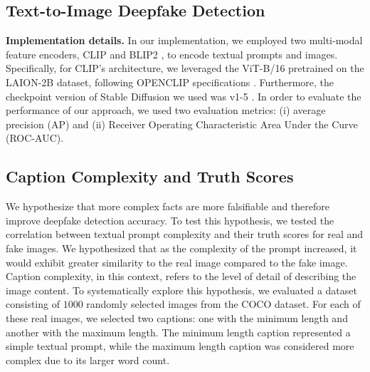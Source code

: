 \documentclass{article} \usepackage{iclr2024_conference,times}
\begin{document}
\subsection{Text-to-Image Deepfake Detection}
\label{app:tti}
\textbf{Implementation details.}
In our implementation, we employed two multi-modal feature encoders, CLIP \citep{clip} and BLIP2 \citep{blip2}, to encode textual prompts and images. Specifically, for CLIP's architecture, we leveraged the ViT-B/16 pretrained on the LAION-2B dataset, following OPENCLIP specifications \citep{Ilharco_OpenCLIP_2021}. Furthermore, the checkpoint version of Stable Diffusion we used was v1-5 \citep{sd_version}.
In order to evaluate the performance of our approach, we used two evaluation metrics: (i) average precision (AP) and (ii) Receiver Operating Characteristic Area Under the Curve (ROC-AUC). 


\subsection{Caption Complexity and Truth Scores}
\label{app:cap_complexity}
We hypothesize that more complex facts are more falsifiable and therefore improve deepfake detection accuracy. To test this hypothesis, we tested the correlation between textual prompt complexity and their truth scores for real and fake images. We hypothesized that as the complexity of the prompt increased, it would exhibit greater similarity to the real image compared to the fake image. Caption complexity, in this context, refers to the level of detail of describing the image content. To systematically explore this hypothesis, we evaluated a dataset consisting of $1000$ randomly selected images from the COCO \citep{coco} dataset. For each of these real images, we selected two captions: one with the minimum length and another with the maximum length. The minimum length caption represented a simple textual prompt, while the maximum length caption was considered more complex due to its larger word count. 
\end{document}
